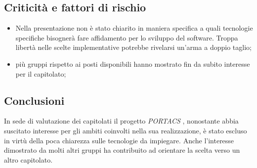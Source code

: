 \subsection{Criticità e fattori di rischio}
\begin{itemize}
\item Nella presentazione non è stato chiarito in maniera specifica a quali tecnologie specifiche bisognerà fare affidamento per lo sviluppo del software. Troppa libertà nelle scelte implementative potrebbe rivelarsi un’arma a doppio taglio;
\item più gruppi rispetto ai posti disponibili hanno mostrato fin da subito interesse per il capitolato;
\end{itemize}

\subsection{Conclusioni}
In sede di valutazione dei capitolati il progetto \textit{PORTACS} , nonostante abbia suscitato interesse per gli ambiti coinvolti nella sua realizzazione, è stato escluso in virtù della poca chiarezza sulle tecnologie da impiegare. Anche l’interesse dimostrato da molti altri gruppi ha contribuito ad orientare la scelta verso un altro capitolato. 


